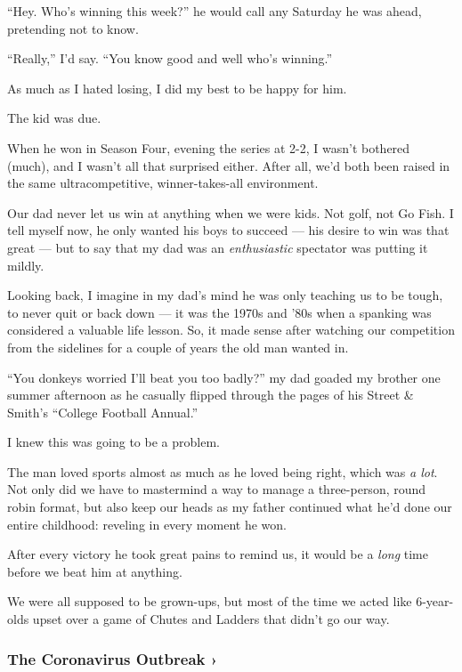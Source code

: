 ``Hey. Who's winning this week?'' he would call any Saturday he was
ahead, pretending not to know.

``Really,'' I'd say. ``You know good and well who's winning.''

As much as I hated losing, I did my best to be happy for him.

The kid was due.

When he won in Season Four, evening the series at 2-2, I wasn't bothered
(much), and I wasn't all that surprised either. After all, we'd both
been raised in the same ultracompetitive, winner-takes-all environment.

Our dad never let us win at anything when we were kids. Not golf, not Go
Fish. I tell myself now, he only wanted his boys to succeed --- his
desire to win was that great --- but to say that my dad was an
\emph{enthusiastic} spectator was putting it mildly.

Looking back, I imagine in my dad's mind he was only teaching us to be
tough, to never quit or back down --- it was the 1970s and '80s when a
spanking was considered a valuable life lesson. So, it made sense after
watching our competition from the sidelines for a couple of years the
old man wanted in.

``You donkeys worried I'll beat you too badly?'' my dad goaded my
brother one summer afternoon as he casually flipped through the pages of
his Street \& Smith's ``College Football Annual.''

I knew this was going to be a problem.

The man loved sports almost as much as he loved being right, which was
\emph{a lot}. Not only did we have to mastermind a way to manage a
three-person, round robin format, but also keep our heads as my father
continued what he'd done our entire childhood: reveling in every moment
he won.

After every victory he took great pains to remind us, it would be a
\emph{long} time before we beat him at anything.

We were all supposed to be grown-ups, but most of the time we acted like
6-year-olds upset over a game of Chutes and Ladders that didn't go our
way.

\href{https://www.nytimes.com/news-event/coronavirus?action=click\&pgtype=Article\&state=default\&region=MAIN_CONTENT_3\&context=storylines_faq}{}

\hypertarget{the-coronavirus-outbreak-}{%
\subsubsection{The Coronavirus Outbreak
›}\label{the-coronavirus-outbreak-}}

